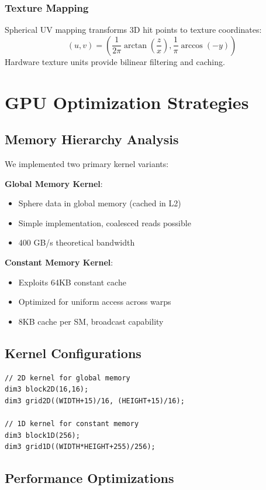 \documentclass[conference]{IEEEtran}
\begin{document}
\subsubsection{Texture Mapping}
Spherical UV mapping transforms 3D hit points to texture coordinates:
\begin{equation}
(u,v) = \left(\frac{1}{2\pi}\arctan\left(\frac{z}{x}\right), \frac{1}{\pi}\arccos(-y)\right)
\end{equation}
Hardware texture units provide bilinear filtering and caching.

\section{GPU Optimization Strategies}

\subsection{Memory Hierarchy Analysis}
We implemented two primary kernel variants:

\textbf{Global Memory Kernel}:
\begin{itemize}
    \item Sphere data in global memory (cached in L2)
    \item Simple implementation, coalesced reads possible
    \item 400 GB/s theoretical bandwidth
\end{itemize}

\textbf{Constant Memory Kernel}:
\begin{itemize}
    \item Exploits 64KB constant cache
    \item Optimized for uniform access across warps
    \item 8KB cache per SM, broadcast capability
\end{itemize}

\subsection{Kernel Configurations}
\begin{lstlisting}
// 2D kernel for global memory
dim3 block2D(16,16);
dim3 grid2D((WIDTH+15)/16, (HEIGHT+15)/16);

// 1D kernel for constant memory
dim3 block1D(256);
dim3 grid1D((WIDTH*HEIGHT+255)/256);
\end{lstlisting}

\subsection{Performance Optimizations}
\end{document}
